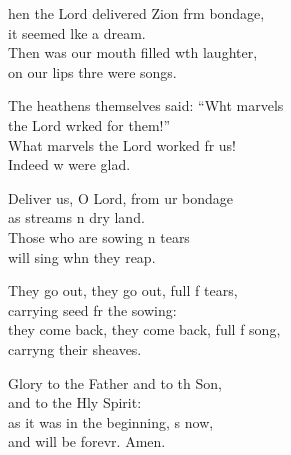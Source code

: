 \settowidth{\versewidth}{they come back, they come back, full of song, *}
\begin{psalmverse}%
  \begin{patverse}
hen the Lord delivered Zion frm bondage,\Med\\
it seemed l\pointup{\i}ke a dream.\\
Then was our mouth filled w\pointup{\i}th laughter,\Med\\
on our lips thre were songs.

The heathens themselves said: “Wht marvels\Med\\
the Lord wrked for them!”\\
What marvels the Lord worked fr us!\Med\\
Indeed w were glad.

Deliver us, O Lord, from ur bondage\Med\\
as streams \pointup{\i}n dry land.\\
Those who are sowing \pointup{\i}n tears\Med\\
will sing whn they reap.

They go out, they go out, full f tears,\Med\\
carrying seed fr the sowing:\\
they come back, they come back, full f song,\Med\\
carry\pointup{\i}ng their sheaves.

Glory to the Father and to th Son,\Med\\
and to the Hly Spirit:\\
as it was in the beginning, \pointup{\i}s now,\Med\\
and will be forevr. Amen. 
  \end{patverse}
\end{psalmverse}
